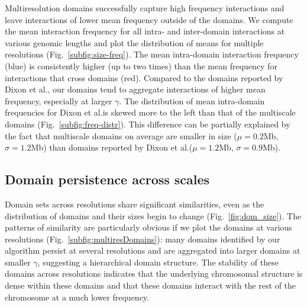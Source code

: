 \documentclass[12pt]{cmuthesis}
\begin{document}
  Multiresolution domains successfully capture high frequency interactions and leave interactions of lower mean frequency outside of the domains. We compute the mean interaction frequency for all intra- and inter-domain interactions at various genomic lengths and plot the distribution of means for multiple resolutions (Fig.~\ref{subfig:size-freq}). The mean intra-domain interaction frequency (blue) is consistently higher (up to two times) than the mean frequency for interactions that cross domains (red). Compared to the domains reported by Dixon et al., our domains tend to aggregate interactions of higher mean frequency, especially at larger $\gamma$. The distribution of mean intra-domain frequencies for Dixon et al.\@ is skewed more to the left than that of the multiscale domains (Fig.~\ref{subfig:freq-distr}). This difference can be partially explained by the fact that multiscale domains on average are smaller in size ($\mu=0.2$Mb, $\sigma=1.2$Mb) than domains reported by Dixon et al.\@ ($\mu=1.2$Mb, $\sigma=0.9$Mb).


  \subsection{Domain persistence across scales}

  Domain sets across resolutions share significant similarities, even as the distribution of domains and their sizes begin to change (Fig.~\ref{fig:dom_size}). The patterns of similarity are particularly obvious if we plot the domains at various resolutions (Fig.~\ref{subfig:multiresDomains}): many domains identified by our algorithm persist at several resolutions and are aggregated into larger domains at smaller $\gamma$, suggesting a hierarchical domain structure. The stability of these domains across resolutions indicates that the underlying chromosomal structure is dense within these domains and that these domains interact with the rest of the chromosome at a much lower frequency.
\end{document}
